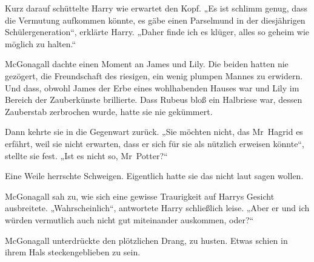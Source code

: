 Kurz darauf schüttelte Harry wie erwartet den Kopf.
„Es ist schlimm genug, dass die Vermutung aufkommen könnte, es gäbe einen Parselmund in der diesjährigen Schülergeneration“, erklärte Harry.
„Daher finde ich es klüger, alles so geheim wie möglich zu halten.“

McGonagall dachte einen Moment an James und Lily. Die beiden hatten nie gezögert, die Freundschaft des riesigen, ein wenig plumpen Mannes zu erwidern. Und dass, obwohl James der Erbe eines wohlhabenden Hauses war und Lily im Bereich der Zauberkünste brillierte. Dass Rubeus bloß ein Halbriese war, dessen Zauberstab zerbrochen wurde, hatte sie nie gekümmert.

Dann kehrte sie in die Gegenwart zurück.
„Sie möchten nicht, das Mr~Hagrid es erfährt, weil sie nicht erwarten, dass er sich für sie als nützlich erweisen könnte“, stellte sie fest.
„Ist es nicht so, Mr~Potter?“

Eine Weile herrschte Schweigen. Eigentlich hatte sie das nicht laut sagen wollen.

McGonagall sah zu, wie sich eine gewisse Traurigkeit auf Harrys Gesicht ausbreitete.
„Wahrscheinlich“, antwortete Harry schließlich leise.
„Aber er und ich würden vermutlich auch nicht gut miteinander auskommen, oder?“

McGonagall unterdrückte den plötzlichen Drang, zu husten. Etwas schien in ihrem Hals steckengeblieben zu sein.

